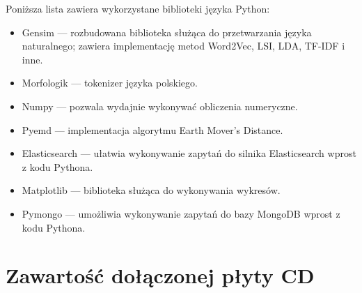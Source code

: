 \documentclass[pl]{minipw} %
\begin{document}
Poniższa lista zawiera wykorzystane biblioteki języka Python:
\begin{itemize}
	\item Gensim --- rozbudowana biblioteka służąca do przetwarzania języka naturalnego; zawiera implementację metod Word2Vec, LSI, LDA, TF-IDF i inne.
	\item Morfologik --- tokenizer języka polskiego.
	\item Numpy --- pozwala wydajnie wykonywać obliczenia numeryczne.
	\item Pyemd --- implementacja algorytmu Earth Mover's Distance.
	\item Elasticsearch --- ułatwia wykonywanie zapytań do silnika Elasticsearch wprost z kodu Pythona.
	\item Matplotlib --- biblioteka służąca do wykonywania wykresów.
	\item Pymongo --- umożliwia wykonywanie zapytań do bazy MongoDB wprost z kodu Pythona.
\end{itemize}

\chapter{Zawartość dołączonej płyty CD}
\end{document}
